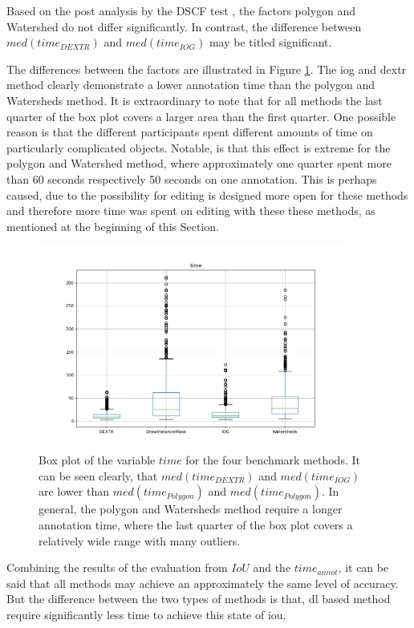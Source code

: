 Based on the post analysis by the DSCF test \cite{CF91-dscf}, the factors polygon and Watershed do not differ significantly.
In contrast, the difference between $med \left( time_{DEXTR} \right)$ and $med \left( time_{IOG} \right)$ may be titled significant.

The differences between the factors are illustrated in Figure \ref{fig:ch5:sec1:time_box_plot}.
The \gls{iog} and \gls{dextr} method clearly demonstrate a lower annotation time than the polygon and Watersheds method.
It is extraordinary to note that for all methods the last quarter of the box plot covers a larger area than the first quarter.
One possible reason is that the different participants spent different amounts of time on particularly complicated objects.
Notable, is that this effect is extreme for the polygon and Watershed method, where approximately one quarter spent more than 60 seconds respectively 50 seconds on one annotation. 
This is perhaps caused, due to the possibility for editing is designed more open for these methods and therefore more time was spent on editing with these these methods, as mentioned at the beginning of this Section.

\begin{figure}
	\centering
	\includegraphics[width=0.9\textwidth]{figures/chap51_time_boxplot.png}
	\caption[Box plot IoU per method]{
		Box plot of the variable $ time $ for the four benchmark methods.
		It can be seen clearly, that $ med \left( time_{DEXTR} \right) $ and $ med \left( time_{IOG} \right) $ are lower than $ med \left( time_{Polygon} \right) $ and $ med \left( time_{Polygon} \right) $.
		In general, the polygon and Watersheds method require a longer annotation time, where the last quarter of the box plot covers a relatively wide range with many outliers. 
	} \label{fig:ch5:sec1:time_box_plot}
\end{figure}



Combining the results of the evaluation from $ IoU $ and the $ time_{annot} $, it can be said that all methods may achieve an approximately the same level of accuracy.
But the difference between the two types of methods is that, \gls{dl} based method require significantly less time to achieve this state of \gls{iou}.




